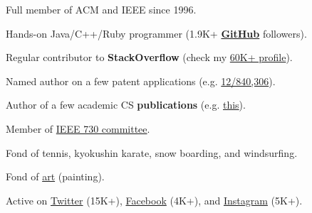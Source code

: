 \documentclass[12pt]{article}
\begin{document}
Full member of ACM and IEEE since 1996.

Hands-on Java/C++/Ruby programmer
  (1.9K+ \textbf{\href{https://github.com/yegor256}{GitHub}} followers).

Regular contributor to \textbf{StackOverflow}
  (check my \href{https://stackexchange.com/users/63162/yegor256}{60K+ profile}).

Named author on a few patent applications
  (e.g. \href{https://www.google.com/patents/US20120023476}{12/840,306}).

Author of a few academic CS \textbf{publications}
  (e.g. \href{https://link.springer.com/chapter/10.1007/978-3-642-02152-7_6}{this}).

Member of \href{http://standards.ieee.org/develop/wg/730.html}{IEEE 730 committee}.

Fond of tennis, kyokushin karate, snow boarding, and windsurfing.

Fond of \href{https://www.yegor256.com/paintings.html}{art} (painting).

Active on
  \href{https://twitter.com/intent/follow?screen_name=yegor256}{Twitter} (15K+),
  \href{https://www.facebook.com/yegor256}{Facebook} (4K+),
  and \href{https://instagram.com/yegor256}{Instagram} (5K+).
\end{document}

